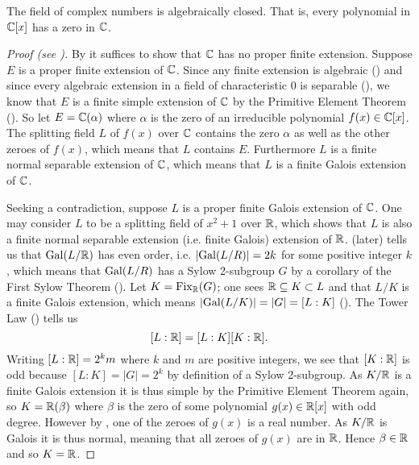\begin{theorem}\label{thrm-fundamental-theorem-of-algebra}
    The field of complex numbers is algebraically closed. That is, every polynomial in $\mathbb{C}[x]$ has a zero in $\mathbb{C}$.
\end{theorem}
\begin{proof}[Proof (see {\cite[Theorem 23.34]{judson_beezer_2022}})]
    By  it suffices to show that $\mathbb{C}$ has no proper finite extension. Suppose $E$ is a proper finite extension of $\mathbb{C}$. Since any finite extension is algebraic () and since every algebraic extension in a field of characteristic 0 is separable (), we know that $E$ is a finite simple extension of $\mathbb{C}$ by the Primitive Element Theorem (). So let $E = \mathbb{C}(\alpha)$ where $\alpha$ is the zero of an irreducible polynomial $f(x) \in \mathbb{C}[x]$. The splitting field $L$ of $f(x)$ over $\mathbb{C}$ contains the zero $\alpha$ as well as the other zeroes of $f(x)$, which means that $L$ contains $E$. Furthermore $L$ is a finite normal separable extension of $\mathbb{C}$, which means that $L$ is a finite Galois extension of $\mathbb{C}$.

    Seeking a contradiction, suppose $L$ is a proper finite Galois extension of $\mathbb{C}$. One may consider $L$ to be a splitting field of $x^2 + 1$ over $\mathbb{R}$, which shows that $L$ is also a finite normal separable extension (i.e. finite Galois) extension of $\mathbb{R}$.  (later) tells us that $\mathrm{Gal}(L/\mathbb{R})$ has even order, i.e. $|\mathrm{Gal}(L/R)| = 2k$ for some positive integer $k$, which means that $\mathrm{Gal}(L/R)$ has a Sylow 2-subgroup $G$ by a corollary of the First Sylow Theorem (). Let $K = \mathrm{Fix}_{\mathbb{R}}(G)$; one sees $\mathbb{R} \subseteq K \subset L$ and that $L/K$ is a finite Galois extension, which means $|\mathrm{Gal}(L/K)| = |G| = [L:K]$ (). The Tower Law () tells us
    \[
        [L:\mathbb{R}] = [L:K][K:\mathbb{R}].
    \]
    Writing $[L:\mathbb{R}] = 2^km$ where $k$ and $m$ are positive integers, we see that $[K:\mathbb{R}]$ is odd because $[L:K] = |G| = 2^k$ by definition of a Sylow 2-subgroup. As $K/\mathbb{R}$ is a finite Galois extension it is thus simple by the Primitive Element Theorem again, so $K = \mathbb{R}(\beta)$ where $\beta$ is the zero of some polynomial $g(x) \in \mathbb{R}[x]$ with odd degree. However by , one of the zeroes of $g(x)$ is a real number. As $K/\mathbb{R}$ is Galois it is thus normal, meaning that all zeroes of $g(x)$ are in $\mathbb{R}$. Hence $\beta \in \mathbb{R}$ and so $K = \mathbb{R}$.


\end{proof}
